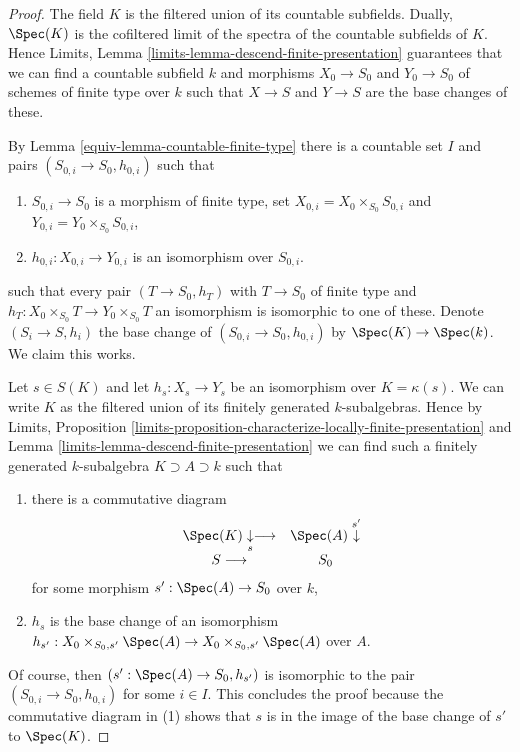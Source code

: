 \begin{proof}

The field $K$ is the filtered union of its countable subfields.
Dually, $\Spec(K)$ is the cofiltered limit of the spectra
of the countable subfields of $K$.
Hence Limits, Lemma \ref{limits-lemma-descend-finite-presentation}
guarantees that we can find a countable subfield
$k$ and morphisms $X_0 \to S_0$ and $Y_0 \to S_0$
of schemes of finite type over $k$ such that
$X \to S$ and $Y \to S$ are the base changes of these.

\medskip\noindent
By Lemma \ref{equiv-lemma-countable-finite-type} there is a countable set $I$ and
pairs $(S_{0, i} \to S_0, h_{0, i})$ such that
\begin{enumerate}
\item $S_{0, i} \to S_0$ is a morphism of finite type, set
$X_{0, i} = X_0 \times_{S_0} S_{0, i}$ and
$Y_{0, i} = Y_0 \times_{S_0} S_{0, i}$,
\item $h_{0, i} : X_{0, i} \to Y_{0, i}$ is an isomorphism over $S_{0, i}$.
\end{enumerate}
such that every pair $(T \to S_0, h_T)$ with $T \to S_0$ of finite type
and $h_T : X_0 \times_{S_0} T \to Y_0 \times_{S_0} T$ an isomorphism
is isomorphic to one of these.
Denote $(S_i \to S, h_i)$ the base change of $(S_{0, i} \to S_0, h_{0, i})$
by $\Spec(K) \to \Spec(k)$.
We claim this works.

\medskip\noindent
Let $s \in S(K)$ and let $h_s : X_s \to Y_s$ be an isomorphism over
$K = \kappa(s)$. We can write $K$ as the filtered union of its
finitely generated $k$-subalgebras. Hence by
Limits, Proposition
\ref{limits-proposition-characterize-locally-finite-presentation} and
Lemma \ref{limits-lemma-descend-finite-presentation}
we can find such a finitely generated $k$-subalgebra
$K \supset A \supset k$ such that
\begin{enumerate}
\item there is a commutative diagram
$$
\begin{array}{cc}\Spec(K) \underset{s}{\downarrow}\longrightarrow & \Spec(A) \overset{s'}{\downarrow} \\ S \longrightarrow & S_0\end{array}
$$
for some morphism $s' : \Spec(A) \to S_0$ over $k$,
\item $h_s$ is the base change of an isomorphism
$h_{s'} : X_0 \times_{S_0, s'} \Spec(A) \to
X_0 \times_{S_0, s'} \Spec(A)$ over $A$.
\end{enumerate}
Of course, then $(s' : \Spec(A) \to S_0, h_{s'})$ is isomorphic
to the pair $(S_{0, i} \to S_0, h_{0, i})$ for some $i \in I$.
This concludes the proof because the commutative diagram
in (1) shows that $s$ is in the image of
the base change of $s'$ to $\Spec(K)$.
\end{proof}

